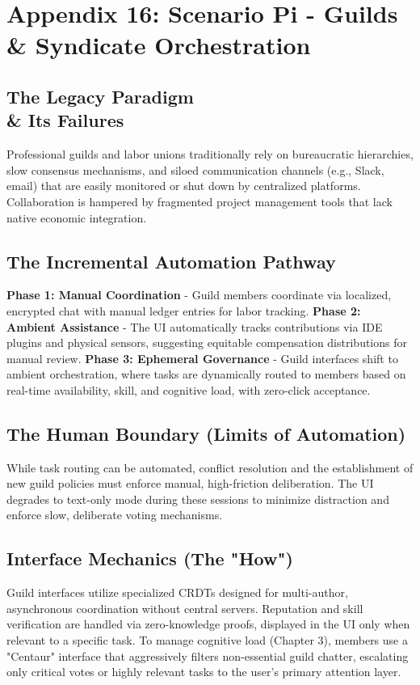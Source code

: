 \section{Appendix 16: Scenario Pi - Guilds \\\& Syndicate Orchestration}

\subsection{The Legacy Paradigm \\\& Its Failures}
Professional guilds and labor unions traditionally rely on bureaucratic hierarchies, slow consensus mechanisms, and siloed communication channels (e.g., Slack, email) that are easily monitored or shut down by centralized platforms. Collaboration is hampered by fragmented project management tools that lack native economic integration.

\subsection{The Incremental Automation Pathway}
\textbf{Phase 1: Manual Coordination} - Guild members coordinate via localized, encrypted chat with manual ledger entries for labor tracking.
\textbf{Phase 2: Ambient Assistance} - The UI automatically tracks contributions via IDE plugins and physical sensors, suggesting equitable compensation distributions for manual review.
\textbf{Phase 3: Ephemeral Governance} - Guild interfaces shift to ambient orchestration, where tasks are dynamically routed to members based on real-time availability, skill, and cognitive load, with zero-click acceptance.

\subsection{The Human Boundary (Limits of Automation)}
While task routing can be automated, conflict resolution and the establishment of new guild policies must enforce manual, high-friction deliberation. The UI degrades to text-only mode during these sessions to minimize distraction and enforce slow, deliberate voting mechanisms.

\subsection{Interface Mechanics (The "How")}
Guild interfaces utilize specialized CRDTs designed for multi-author, asynchronous coordination without central servers. Reputation and skill verification are handled via zero-knowledge proofs, displayed in the UI only when relevant to a specific task. To manage cognitive load (Chapter 3), members use a "Centaur" interface that aggressively filters non-essential guild chatter, escalating only critical votes or highly relevant tasks to the user's primary attention layer.

